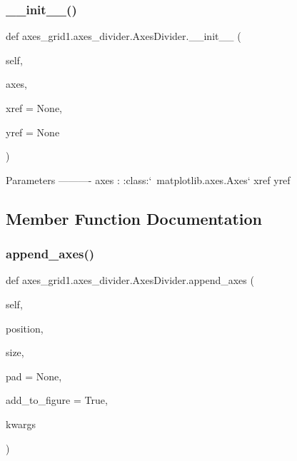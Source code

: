 \subsubsection{\texorpdfstring{\+\_\+\+\_\+init\+\_\+\+\_\+()}{\_\_init\_\_()}}
{\footnotesize\ttfamily def axes\+\_\+grid1.\+axes\+\_\+divider.\+Axes\+Divider.\+\_\+\+\_\+init\+\_\+\+\_\+ (\begin{DoxyParamCaption}\item[{}]{self,  }\item[{}]{axes,  }\item[{}]{xref = {\ttfamily None},  }\item[{}]{yref = {\ttfamily None} }\end{DoxyParamCaption})}

\begin{DoxyVerb}Parameters
----------
axes : :class:`~matplotlib.axes.Axes`
xref
yref
\end{DoxyVerb}
 

\subsection{Member Function Documentation}
\mbox{\label{classaxes__grid1_1_1axes__divider_1_1AxesDivider_ae90543d0002a36bc6de3f30bee28ad2e}} 
\subsubsection{\texorpdfstring{append\+\_\+axes()}{append\_axes()}}
{\footnotesize\ttfamily def axes\+\_\+grid1.\+axes\+\_\+divider.\+Axes\+Divider.\+append\+\_\+axes (\begin{DoxyParamCaption}\item[{}]{self,  }\item[{}]{position,  }\item[{}]{size,  }\item[{}]{pad = {\ttfamily None},  }\item[{}]{add\+\_\+to\+\_\+figure = {\ttfamily True},  }\item[{}]{kwargs }\end{DoxyParamCaption})}


